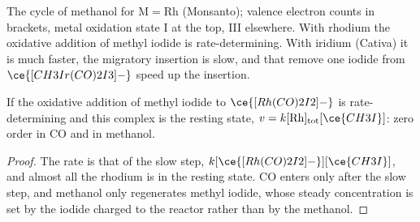 \begin{omfigure}

{\small The  cycle of methanol for $\mathrm M = \mathrm{Rh}$ (Monsanto); valence
electron counts in brackets, metal oxidation state I at the top, III elsewhere.
With rhodium the oxidative addition of methyl iodide is rate-determining. With
iridium (Cativa) it is much faster, the migratory insertion is slow, and
 that remove one iodide from $\ce{[CH3Ir(CO)2I3]-}$ speed up the insertion.}
\end{omfigure}

\begin{proposition}\label{prop:b3:homogeneous-catalysis:monsanto-rate}
If the oxidative addition of methyl iodide to $\ce{[Rh(CO)2I2]-}$ is rate-determining and
this complex is the resting state, $v = k[\mathrm{Rh}]_{\mathrm{tot}}[\ce{CH3I}]$: zero order in CO and in
methanol.
\end{proposition}

\begin{proof}
The rate is that of the slow step, $k[\ce{[Rh(CO)2I2]-}][\ce{CH3I}]$, and almost all the rhodium
is in the resting state. CO enters only after the slow step, and methanol only
regenerates methyl iodide, whose steady concentration is set by the iodide
charged to the reactor rather than by the methanol.
\end{proof}

